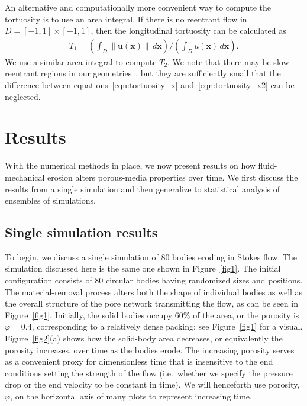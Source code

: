 \documentclass[3p]{elsarticle}
\newcommand{\uu}{{\mathbf{u}}}
\newcommand{\xx}{{\mathbf{x}}}
\begin{document}
An alternative and computationally more convenient way to compute the tortuosity is to use an area integral. If there is no reentrant flow in $D = [-1,1] \times [-1,1]$, then the longitudinal tortuosity can be calculated as~\citep{dud-koz-mat2011}
\begin{align}
  T_1 = \left(\int_D \|\uu(\xx)\|\, d\xx \right) \Bigg/
      \left(\int_D u(\xx)\, d\xx \right).
  \label{eqn:tortuosity_x2}
\end{align}
We use a similar area integral to compute $T_2$. We note that there may be slow reentrant regions in our geometries~\cite{chiu2020viscous}, but they are sufficiently small that the difference between equations~\eqref{eqn:tortuosity_x} and~\eqref{eqn:tortuosity_x2} can be neglected.

\section{Results}
\label{sec:results}

With the numerical methods in place, we now present results on how fluid-mechanical erosion alters porous-media properties over time. We first discuss the results from a single simulation and then generalize to statistical analysis of ensembles of simulations.  

\subsection{Single simulation results}
\label{sec:single_sim}

To begin, we discuss a single simulation of 80 bodies eroding in Stokes flow. The simulation discussed here is the same one shown in Figure~\ref{fig1}. The initial configuration consists of 80 circular bodies having randomized sizes and positions. The material-removal process alters both the shape of individual bodies as well as the overall structure of the pore network transmitting the flow, as can be seen in Figure~\ref{fig1}. Initially, the solid bodies occupy $60\%$ of the area, or the porosity is $\varphi = 0.4$, corresponding to a relatively dense packing; see Figure~\ref{fig1} for a visual. Figure~\ref{fig2}(a) shows how the solid-body area decreases, or equivalently the porosity increases, over time as the bodies erode. The increasing porosity serves as a convenient proxy for dimensionless time that is insensitive to the end conditions setting the strength of the flow (i.e.~whether we specify the pressure drop or the end velocity to be constant in time). We will henceforth use porosity, $\varphi$, on the horizontal axis of many plots to represent increasing time.
\end{document}
